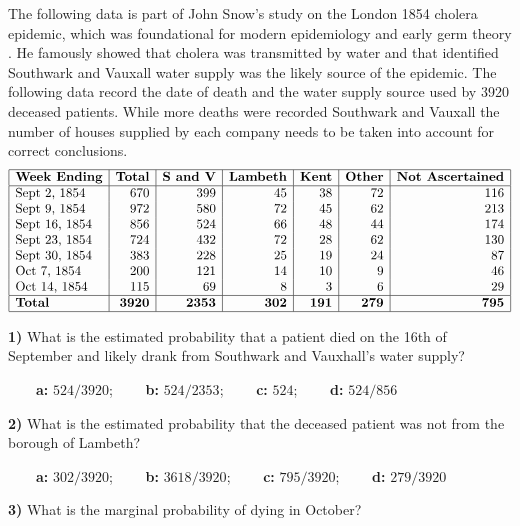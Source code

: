 \documentclass[
]{book}
\begin{document}
The following data is part of John Snow's study on the London 1854 cholera epidemic, which was foundational for modern epidemiology and early germ theory \citep{snow1855mode}. He famously showed that cholera was transmitted by water and that identified Southwark and Vauxall water supply was the likely source of the epidemic. The following data record the date of death and the water supply source used by 3920 deceased patients. While more deaths were recorded Southwark and Vauxall the number of houses supplied by each company needs to be taken into account for correct conclusions.\\
\[
\begin{array}{|l|r|r|r|r|r|r|}
\hline
\textbf{Week Ending} & \textbf{Total} & \textbf{S and V} & \textbf{Lambeth} & \textbf{Kent} & \textbf{Other} & \textbf{Not Ascertained} \\
\hline
\text{Sept 2, 1854}  & 670 & 399 & 45  & 38  & 72 & 116 \\
\text{Sept 9, 1854}  & 972 & 580 & 72  & 45  & 62 & 213 \\
\text{Sept 16, 1854} & 856 & 524 & 66  & 48  & 44 & 174 \\
\text{Sept 23, 1854} & 724 & 432 & 72  & 28  & 62 & 130 \\
\text{Sept 30, 1854} & 383 & 228 & 25  & 19  & 24 &  87 \\
\text{Oct 7, 1854}   & 200 & 121 & 14  & 10  & 9  &  46 \\
\text{Oct 14, 1854}  & 115 &  69 & 8   & 3   & 6  &  29 \\
\hline
\textbf{Total}       & \textbf{3920} & \textbf{2353} & \textbf{302} & \textbf{191} & \textbf{279} & \textbf{795} \\
\hline
\end{array}
\]

\textbf{1)} What is the estimated probability that a patient died on the 16th of September and likely drank from Southwark and Vauxhall's water supply?

\textbf{\(\qquad\)a:} \(524/3920\); \textbf{\(\qquad\)b:} \(524/2353\); \textbf{\(\qquad\)c:} \(524\); \textbf{\(\qquad\)d:} \(524/856\)

\textbf{2)} What is the estimated probability that the deceased patient was not from the borough of Lambeth?

\textbf{\(\qquad\)a:} \(302/3920\); \textbf{\(\qquad\)b:} \(3618/3920\); \textbf{\(\qquad\)c:} \(795/3920\); \textbf{\(\qquad\)d:} \(279/3920\)

\textbf{3)} What is the marginal probability of dying in October?
\end{document}
